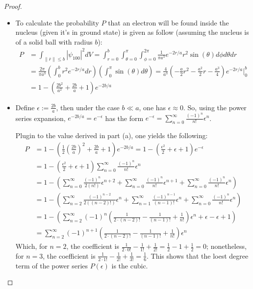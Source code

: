 \documentclass{article}
\begin{document}
\begin{proof}
    
    \hfil

    \begin{itemize}
        \item[(a)] To calculate the probability $P$ that an electron will be found inside the nucleus (given it's in ground state) is given as follow (assuming the nucleus is of a solid ball with radius $b$):
        \begin{align}
            P &= \int_{\|\bar{r}\|\leq b}|\psi_{100}|^2 dV = \int_{r=0}^{b}\int_{\theta=0}^{\pi}\int_{\phi=0}^{2\pi}\frac{1}{\pi a^3}e^{-2r/a}r^2\sin(\theta)d\phi d\theta dr\\
            &= \frac{2\pi}{\pi a^3}\left(\int_{0}^{b}r^2e^{-2r/a}dr\right)\left(\int_{0}^{\pi}\sin(\theta)d\theta\right) = \frac{4}{a^3}\left(-\frac{a}{2}r^2-\frac{a^2}{2}r - \frac{a^3}{4}\right)e^{-2r/a}\bigg|_{0}^{b}\\
            &= 1-\left(\frac{2b^2}{a^2}+\frac{2b}{a}+1\right)e^{-2b/a}
        \end{align}

        \hfil

        \item[(b)] Define $\epsilon:=\frac{2b}{a}$, then under the case $b\ll a$, one has $\epsilon\approx 0$. So, using the power series expansion, $e^{-2b/a} = e^{-\epsilon}$ has the form $e^{-\epsilon}=\sum_{n=0}^\infty\frac{(-1)^n}{n!}\epsilon^n$.
        
        Plugin to the value derived in part (a), one yields the following:
        \begin{align}
            P &= 1-\left(\frac{1}{2}\left(\frac{2b}{a}\right)^2+\frac{2b}{a}+1\right)e^{-2b/a} = 1-\left(\frac{\epsilon^2}{2}+\epsilon+1\right)e^{-\epsilon}\\
            &= 1-\left(\frac{\epsilon^2}{2}+\epsilon+1\right)\sum_{n=0}^\infty\frac{(-1)^n}{n!}\epsilon^n\\ 
            &=1-\left(\sum_{n=0}^\infty\frac{(-1)^n}{2(n!)}\epsilon^{n+2}+\sum_{n=0}^\infty\frac{(-1)^n}{n!}\epsilon^{n+1}+\sum_{n=0}^\infty\frac{(-1)^n}{n!}\epsilon^n\right)\\
            &= 1-\left(\sum_{n=2}^\infty\frac{(-1)^{n-2}}{2((n-2)!)}\epsilon^n + \sum_{n=1}^\infty\frac{(-1)^{n-1}}{(n-1)!}\epsilon^n + \sum_{n=0}^\infty\frac{(-1)^n}{n!}\epsilon^n\right)\\
            &= 1-\left(\sum_{n=2}^\infty(-1)^n\left(\frac{1}{2\cdot (n-2)!}-\frac{1}{(n-1)!}+\frac{1}{n!}\right)\epsilon^n + \epsilon -\epsilon +1\right)\\
            &= \sum_{n=2}^\infty (-1)^{n+1}\left(\frac{1}{2\cdot (n-2)!}-\frac{1}{(n-1)!}+\frac{1}{n!}\right)\epsilon^n
        \end{align}
        Which, for $n=2$, the coefficient is $\frac{1}{2\cdot 0!}-\frac{1}{1!}+\frac{1}{2!} = \frac{1}{2}-1+\frac{1}{2}=0$; nonetheless, for $n=3$, the coefficient is $\frac{1}{2\cdot 1!}-\frac{1}{2!}+\frac{1}{3!} = \frac{1}{6}$. This shows that the loest degree term of the power series $P(\epsilon)$ is the cubic.


\end{itemize}
\end{proof}
\end{document}
